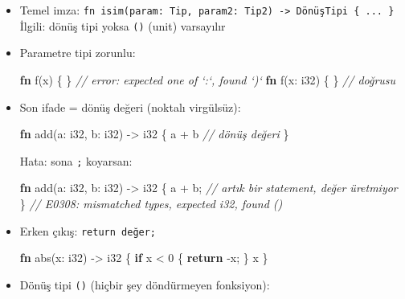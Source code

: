 \documentclass[12pt,a4paper]{article}
\newenvironment{Shaded}{}{}
\newcommand{\CommentTok}[1]{\textcolor[rgb]{0.38,0.63,0.69}{\textit{#1}}}
\newcommand{\ControlFlowTok}[1]{\textcolor[rgb]{0.00,0.44,0.13}{\textbf{#1}}}
\newcommand{\DataTypeTok}[1]{\textcolor[rgb]{0.56,0.13,0.00}{#1}}
\newcommand{\DecValTok}[1]{\textcolor[rgb]{0.25,0.63,0.44}{#1}}
\newcommand{\FunctionTok}[1]{\textcolor[rgb]{0.02,0.16,0.49}{#1}}
\newcommand{\KeywordTok}[1]{\textcolor[rgb]{0.00,0.44,0.13}{\textbf{#1}}}
\newcommand{\NormalTok}[1]{#1}
\newcommand{\OperatorTok}[1]{\textcolor[rgb]{0.40,0.40,0.40}{#1}}
\begin{document}
\begin{itemize}
\tightlist
\item
  Temel imza: \texttt{fn\ isim(param:\ Tip,\ param2:\ Tip2)\ -\textgreater{}\ DönüşTipi\ \{\ ...\ \}}
  İlgili: dönüş tipi yoksa \texttt{()} (unit) varsayılır
\item
  Parametre tipi zorunlu:

\begin{Shaded}
\begin{Highlighting}[]
\KeywordTok{fn} \FunctionTok{f}\OperatorTok{(}\NormalTok{x}\OperatorTok{)} \OperatorTok{\{} \OperatorTok{\}}   \CommentTok{// error: expected one of `:`, found `)`}
\KeywordTok{fn} \FunctionTok{f}\OperatorTok{(}\NormalTok{x}\OperatorTok{:} \DataTypeTok{i32}\OperatorTok{)} \OperatorTok{\{} \OperatorTok{\}}   \CommentTok{// doğrusu}
\end{Highlighting}
\end{Shaded}
\item
  Son ifade = dönüş değeri (noktalı virgülsüz):

\begin{Shaded}
\begin{Highlighting}[]
\KeywordTok{fn} \FunctionTok{add}\OperatorTok{(}\NormalTok{a}\OperatorTok{:} \DataTypeTok{i32}\OperatorTok{,}\NormalTok{ b}\OperatorTok{:} \DataTypeTok{i32}\OperatorTok{)} \OperatorTok{-\textgreater{}} \DataTypeTok{i32} \OperatorTok{\{}
\NormalTok{    a }\OperatorTok{+}\NormalTok{ b       }\CommentTok{// dönüş değeri}
\OperatorTok{\}}
\end{Highlighting}
\end{Shaded}


  Hata: sona \texttt{;} koyarsan:

\begin{Shaded}
\begin{Highlighting}[]
\KeywordTok{fn} \FunctionTok{add}\OperatorTok{(}\NormalTok{a}\OperatorTok{:} \DataTypeTok{i32}\OperatorTok{,}\NormalTok{ b}\OperatorTok{:} \DataTypeTok{i32}\OperatorTok{)} \OperatorTok{-\textgreater{}} \DataTypeTok{i32} \OperatorTok{\{}
\NormalTok{    a }\OperatorTok{+}\NormalTok{ b}\OperatorTok{;}      \CommentTok{// artık bir statement, değer üretmiyor}
\OperatorTok{\}}
\CommentTok{// E0308: mismatched types, expected i32, found ()}
\end{Highlighting}
\end{Shaded}
\item
  Erken çıkış: \texttt{return\ değer;}

\begin{Shaded}
\begin{Highlighting}[]
\KeywordTok{fn} \FunctionTok{abs}\OperatorTok{(}\NormalTok{x}\OperatorTok{:} \DataTypeTok{i32}\OperatorTok{)} \OperatorTok{-\textgreater{}} \DataTypeTok{i32} \OperatorTok{\{}
    \ControlFlowTok{if}\NormalTok{ x }\OperatorTok{\textless{}} \DecValTok{0} \OperatorTok{\{} \ControlFlowTok{return} \OperatorTok{-}\NormalTok{x}\OperatorTok{;} \OperatorTok{\}}
\NormalTok{    x}
\OperatorTok{\}}
\end{Highlighting}
\end{Shaded}
\item
  Dönüş tipi \texttt{()} (hiçbir şey döndürmeyen fonksiyon):


\end{itemize}
\end{document}
